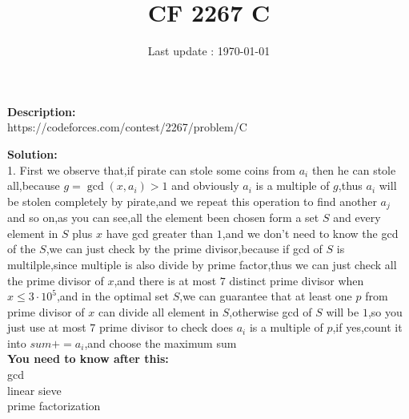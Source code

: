 \documentclass{article}
\begin{document}
\title{\textbf{CF 2267 C}}
\author{}
\date{Last update : \today}

\maketitle

\noindent \textbf{Description:}\\
https://codeforces.com/contest/2267/problem/C

\noindent \textbf{Solution:}\\
1. First we observe that,if pirate can stole some coins from $a_i$ then he can stole all,because $g=\gcd(x,a_i)> 1$ and obviously $a_i$ is a multiple of $g$,thus $a_i$ will be stolen completely by pirate,and we repeat this operation to find another $a_j$ and so on,as you can see,all the element been chosen form a set $S$ and every element in $S$ plus $x$ have gcd greater than $1$,and we don't need to know the gcd of the $S$,we can just check by the prime divisor,because if gcd of $S$ is multilple,since multiple is also divide by prime factor,thus we can just check all the prime divisor of $x$,and there is at most $7$ distinct prime divisor when $x\le 3\cdot 10^5$,and in the optimal set $S$,we can guarantee that at least one $p$ from prime divisor of $x$ can divide all element in $S$,otherwise gcd of $S$ will be $1$,so you just use at most $7$ prime divisor to check does $a_i$ is a multiple of $p$,if yes,count it into $sum+=a_i$,and choose the maximum sum
\\
\noindent \textbf{You need to know after this:}\\
gcd\\
linear sieve\\
prime factorization
\end{document}

